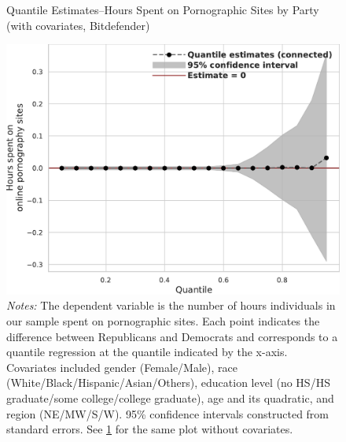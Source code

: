 \documentclass[12pt,twoside]{article}
\begin{document}
\begin{figure}[ht]
	\centering
	\caption{Quantile Estimates--Hours Spent on Pornographic Sites by Party (with covariates, Bitdefender)}
	\includegraphics[width=.55\linewidth]{figs/bitdefender_quantile_reg_covariates_duration_adult.pdf}
	\caption*{\footnotesize \emph{Notes:} 
		The dependent variable is the number of hours individuals in our sample spent on pornographic sites.
		Each point indicates the difference between Republicans and Democrats and corresponds to a quantile regression at the quantile indicated by the x-axis.
		Covariates included gender (Female/Male), race (White/Black/Hispanic/Asian/Others), education level (no HS/HS graduate/some college/college graduate), age and its quadratic, and region (NE/MW/S/W).
		95\% confidence intervals constructed from standard errors.
		See \cref{fig:bitdefender_quantile_regression_duration_covariates} for the same plot without covariates.
	}
	\label{fig:bitdefender_quantile_regression_duration_covariates}
\end{figure}


\FloatBarrier
\clearpage
\end{document}
